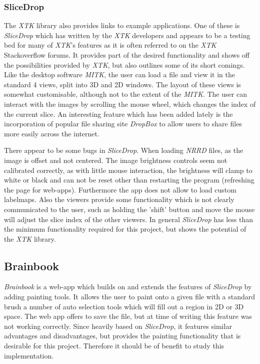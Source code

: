 \documentclass[a4paper,11pt,titlepage]{article}
\begin{document}
\subsubsection{SliceDrop}
The \textit{XTK} library also provides links to example applications. One of these is \textit{SliceDrop}\cite{slicedrop} which has written by the \textit{XTK} developers and appears to be a testing bed for many of \textit{XTK}'s features as it is often referred to on the \textit{XTK} Stackoverflow forums. It provides part of the desired functionality and shows off the possibilities provided by \textit{XTK}, but also outlines some of its short comings. Like the desktop software \textit{MITK}, the user can load a file and view it in the standard 4 views, split into 3D and 2D windows. The layout of these views is somewhat customisable, although not to the extent of the \textit{MITK}. The user can interact with the images by scrolling the mouse wheel, which changes the index of the current slice. An interesting feature which has been added lately is the incorporation of popular file sharing site \textit{DropBox} to allow users to share files more easily across the internet.

There appear to be some bugs in \textit{SliceDrop}. When loading \textit{NRRD} files, as the image is offset and not centered. The image brightness controls seem not calibrated correctly, as with little mouse interaction, the brightness will clamp to white or black and can not be reset other than restarting the program (refreshing the page for web-apps). Furthermore the app does not allow to load custom labelmaps. Also the viewers provide some functionality which is not clearly communicated to the user, such as holding the 'shift' button and move the mouse will adjust the slice index of the other viewers. In general \textit{SliceDrop} has less than the minimum functionality required for this project, but shows the potential of the \textit{XTK} library. 


\subsection{Brainbook}
\textit{Brainbook}\cite{brainbook} is a web-app which builds on and extends the features of \textit{SliceDrop} by adding painting tools. It allows the user to paint onto a given file with a standard brush a number of auto selection tools which will fill out a region in 2D or 3D space. The web app offers to save the file, but at time of writing this feature was not working correctly. Since heavily based on \textit{SliceDrop}, it features similar advantages and disadvantages, but provides the painting functionality that is desirable for this project. Therefore it should be of benefit to study this implementation.
\end{document}
